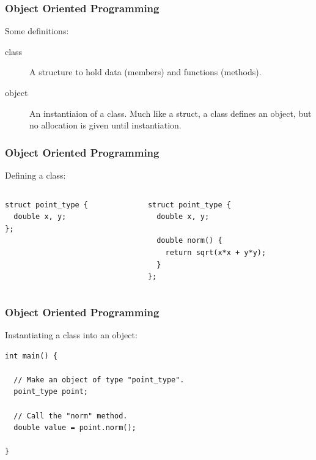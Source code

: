 \documentclass{beamer}
\begin{document}
\begin{frame}
  \frametitle{Object Oriented Programming}
  Some definitions:
  \begin{description}
    \item[class] A structure to hold data (members) and functions (methods).
    \item[object] An instantiaion of a class. Much like a struct, a class
      defines an object, but no allocation is given until instantiation.
  \end{description}
\end{frame}

\begin{frame}[fragile]
  \frametitle{Object Oriented Programming}
  Defining a class:
  \begin{example}
    \begin{columns}
      \begin{column}{.3\textwidth}
        \begin{lstlisting}
struct point_type {
  double x, y;
};
        \end{lstlisting}
      \end{column}
      \hspace{-10pt}
      \vrule{}
      \hspace{8pt}
      \begin{column}{.5\textwidth}
        \begin{lstlisting}
struct point_type {
  double x, y;

  double norm() {
    return sqrt(x*x + y*y);
  }
};
        \end{lstlisting}
      \end{column}
    \end{columns}
  \end{example}
\end{frame}

\begin{frame}[fragile]
  \frametitle{Object Oriented Programming}
  Instantiating a class into an object:
  \begin{example}
    \begin{lstlisting}
int main() {

  // Make an object of type "point_type".
  point_type point;

  // Call the "norm" method.
  double value = point.norm();

}
    \end{lstlisting}
  \end{example}
\end{frame}
\end{document}
